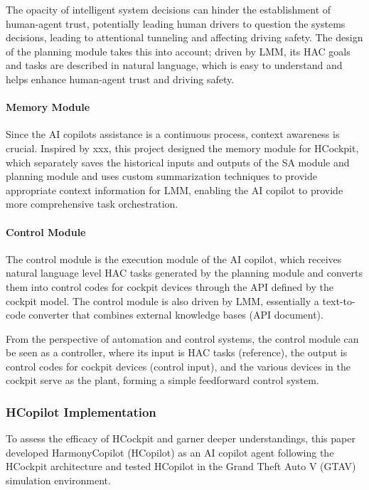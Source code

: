 \documentclass[
]{article}
\begin{document}
The opacity of intelligent system decisions can hinder the establishment
of human-agent trust, potentially leading human drivers to question the
system\textquotesingle s decisions, leading to attentional tunneling and
affecting driving safety. The design of the planning module takes this
into account; driven by LMM, its HAC goals and tasks are described in
natural language, which is easy to understand and helps enhance
human-agent trust and driving safety.

\paragraph{Memory Module}\label{memory-module}

Since the AI copilot\textquotesingle s assistance is a continuous
process, context awareness is crucial. Inspired by xxx, this project
designed the memory module for HCockpit, which separately saves the
historical inputs and outputs of the SA module and planning module and
uses custom summarization techniques to provide appropriate context
information for LMM, enabling the AI copilot to provide more
comprehensive task orchestration.

\paragraph{Control Module}\label{control-module}

The control module is the execution module of the AI copilot, which
receives natural language level HAC tasks generated by the planning
module and converts them into control codes for cockpit devices through
the API defined by the cockpit model. The control module is also driven
by LMM, essentially a text-to-code converter that combines external
knowledge bases (API document).

From the perspective of automation and control systems, the control
module can be seen as a controller, where its input is HAC tasks
(reference), the output is control codes for cockpit devices (control
input), and the various devices in the cockpit serve as the plant,
forming a simple feedforward control system.

\subsubsection{HCopilot Implementation}\label{hcopilot-implementation}

To assess the efficacy of HCockpit and garner deeper understandings,
this paper developed HarmonyCopilot (HCopilot) as an AI copilot agent
following the HCockpit architecture and tested HCopilot in the Grand
Theft Auto V (GTAV) simulation environment.
\end{document}
